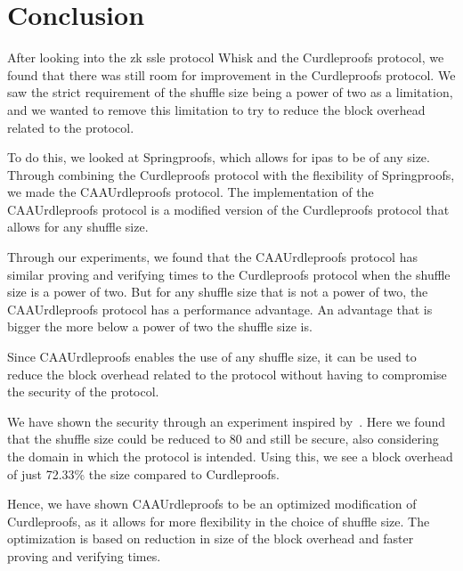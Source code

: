 

\section{Conclusion}\label{sec:conclusion}
After looking into the \gls{zk} \gls{ssle} protocol Whisk and the Curdleproofs protocol, we found that there was still room for improvement in the Curdleproofs protocol.
We saw the strict requirement of the shuffle size being a power of two as a limitation, and we wanted to remove this limitation to try to reduce the block overhead related to the protocol.

To do this, we looked at Springproofs, which allows for \glspl{ipa} to be of any size.
Through combining the Curdleproofs protocol with the flexibility of Springproofs, we made the CAAUrdleproofs protocol.
The implementation of the CAAUrdleproofs protocol is a modified version of the Curdleproofs protocol that allows for any shuffle size.

Through our experiments, we found that the CAAUrdleproofs protocol has similar proving and verifying times to the Curdleproofs protocol when the shuffle size is a power of two.
But for any shuffle size that is not a power of two, the CAAUrdleproofs protocol has a performance advantage. 
An advantage that is bigger the more below a power of two the shuffle size is.

Since CAAUrdleproofs enables the use of any shuffle size, it can be used to reduce the block overhead related to the protocol without having to compromise the security of the protocol.

We have shown the security through an experiment inspired by~\cite{cryptoeprint:2022/560}.
Here we found that the shuffle size could be reduced to 80 and still be secure, also considering the domain in which the protocol is intended.
Using this, we see a block overhead of just 72.33\% the size compared to Curdleproofs.
 

Hence, we have shown CAAUrdleproofs to be an optimized modification of Curdleproofs, as it allows for more flexibility in the choice of shuffle size. 
The optimization is based on reduction in size of the block overhead and faster proving and verifying times.
